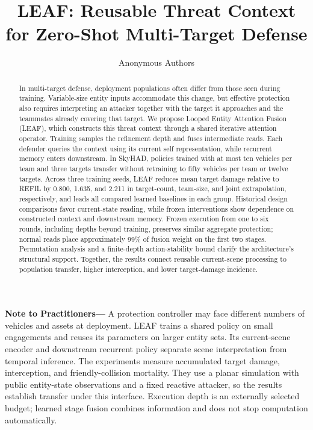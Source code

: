 \documentclass[journal,10pt]{IEEEtran}
\begin{document}
\raggedbottom
\title{LEAF: Reusable Threat Context for Zero-Shot Multi-Target Defense}
\author{Anonymous Authors}
\maketitle
{}
\begin{abstract}
In multi-target defense, deployment populations often differ from those seen during training. Variable-size entity inputs accommodate this change, but effective protection also requires interpreting an attacker together with the target it approaches and the teammates already covering that target. We propose Looped Entity Attention Fusion (LEAF), which constructs this threat context through a shared iterative attention operator. Training samples the refinement depth and fuses intermediate reads. Each defender queries the context using its current self representation, while recurrent memory enters downstream. In SkyHAD, policies trained with at most ten vehicles per team and three targets transfer without retraining to fifty vehicles per team or twelve targets. Across three training seeds, LEAF reduces mean target damage relative to REFIL by 0.800, 1.635, and 2.211 in target-count, team-size, and joint extrapolation, respectively, and leads all compared learned baselines in each group. Historical design comparisons favor current-state reading, while frozen interventions show dependence on constructed context and downstream memory. Frozen execution from one to six rounds, including depths beyond training, preserves similar aggregate protection; normal reads place approximately 99\% of fusion weight on the first two stages. Permutation analysis and a finite-depth action-stability bound clarify the architecture's structural support. Together, the results connect reusable current-scene processing to population transfer, higher interception, and lower target-damage incidence.
\end{abstract}
\noindent\textbf{Note to Practitioners---}
A protection controller may face different numbers of vehicles and assets at deployment. LEAF trains a shared policy on small engagements and reuses its parameters on larger entity sets. Its current-scene encoder and downstream recurrent policy separate scene interpretation from temporal inference. The experiments measure accumulated target damage, interception, and friendly-collision mortality. They use a planar simulation with public entity-state observations and a fixed reactive attacker, so the results establish transfer under this interface. Execution depth is an externally selected budget; learned stage fusion combines information and does not stop computation automatically.
\end{document}
